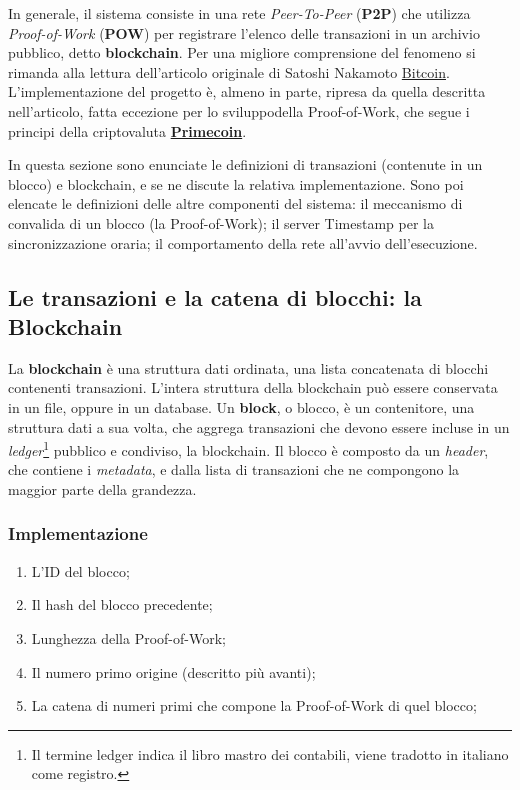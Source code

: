 In generale, il sistema consiste in una rete \textit{Peer-To-Peer} (\textbf{P2P}) che utilizza \textit{Proof-of-Work} (\textbf{POW}) per registrare l'elenco delle transazioni in un archivio pubblico, detto \textbf{blockchain}. Per una migliore comprensione del fenomeno si rimanda alla lettura dell'articolo originale di Satoshi Nakamoto \href{https://bitcoin.org/bitcoin.pdf}{Bitcoin}. 
L'implementazione del progetto è, almeno in parte, ripresa da quella descritta nell'articolo, fatta eccezione per lo sviluppodella Proof-of-Work, che segue i principi della criptovaluta \href{http://primecoin.io/bin/primecoin-paper.pdf}{\textbf{Primecoin}}.

In questa sezione sono enunciate le definizioni di transazioni (contenute in un blocco) e blockchain, e se ne discute la relativa implementazione. Sono poi elencate le definizioni delle altre componenti del sistema: il meccanismo di convalida di un blocco (la Proof-of-Work); il server Timestamp per la sincronizzazione oraria; il comportamento della rete all'avvio dell'esecuzione.

\subsection{Le transazioni e la catena di blocchi: la Blockchain}
La \textbf{blockchain} è una struttura dati ordinata, una lista concatenata di blocchi contenenti transazioni. L'intera struttura della blockchain può essere conservata in un file, oppure in un database. Un \textbf{block}, o blocco, è un contenitore, una struttura dati a sua volta, che aggrega transazioni che devono essere incluse in un \textit{ledger}\footnote{Il termine ledger indica il libro mastro dei contabili, viene tradotto in italiano come registro.} pubblico e condiviso, la blockchain. 
Il blocco è composto da un \textit{header}, che contiene i \textit{metadata}, e dalla lista di transazioni che ne compongono la maggior parte della grandezza.

\subsubsection{Implementazione}
\begin{enumerate}
    \item L'ID del blocco;
    \item Il hash del blocco precedente;
    \item Lunghezza della Proof-of-Work;
    \item Il numero primo origine (descritto più avanti);
    \item La catena di numeri primi che compone la Proof-of-Work di quel blocco;
\end{enumerate}

